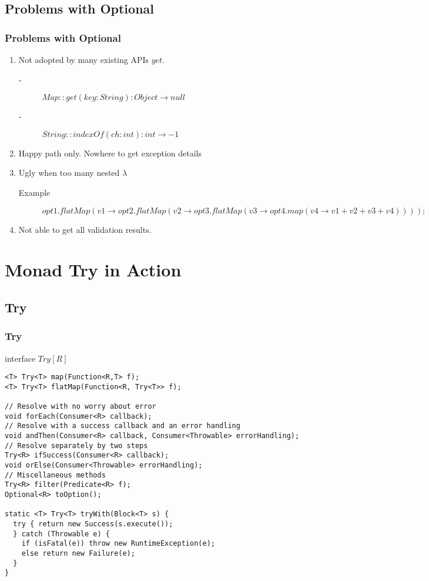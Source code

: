 \documentclass{beamer}
\begin{document}
\subsection{Problems with Optional}
\begin{frame}
  \frametitle{Problems with Optional}
    \begin{enumerate}
    \item<1-> Not adopted by many existing APIs $yet$.
      \begin{description}
      \item[-] $Map::get(key: String): Object \rightarrow null $
      \item[-] $String::indexOf(ch: int): int \rightarrow -1$
      \end{description}
    \item<2-> Happy path only. Nowhere to get exception details
    \item<3-> Ugly when too many nested \alert{$\lambda$}
        \begin{description}
        \item[Example] $opt1.flatMap(v1 \rightarrow opt2.flatMap(v2 \rightarrow opt3.flatMap(v3 \rightarrow opt4.map(v4 \rightarrow v1 + v2 + v3 + v4))));$
        \end{description}
    \item<4-> Not able to get all validation results.
    \end{enumerate}
\end{frame}
  
\section{Monad Try in Action}
\subsection{Try}
\begin{frame}[fragile]
  \frametitle{Try}
  interface $Try \left[R \right]$
  \scriptsize{
  \begin{verbatim}
<T> Try<T> map(Function<R,T> f);
<T> Try<T> flatMap(Function<R, Try<T>> f);

// Resolve with no worry about error
void forEach(Consumer<R> callback);
// Resolve with a success callback and an error handling
void andThen(Consumer<R> callback, Consumer<Throwable> errorHandling);
// Resolve separately by two steps
Try<R> ifSuccess(Consumer<R> callback);
void orElse(Consumer<Throwable> errorHandling);
// Miscellaneous methods
Try<R> filter(Predicate<R> f);
Optional<R> toOption();

static <T> Try<T> tryWith(Block<T> s) {
  try { return new Success(s.execute());
  } catch (Throwable e) {
    if (isFatal(e)) throw new RuntimeException(e);
    else return new Failure(e);
  }
}
  \end{verbatim}
  }
\end{frame}
\end{document}
